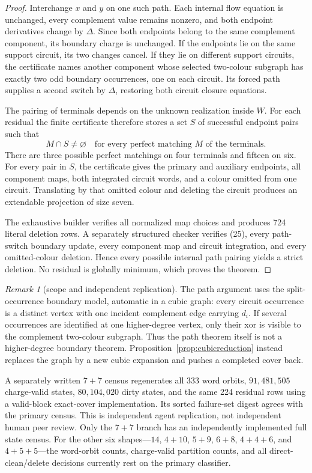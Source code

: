 \documentclass[11pt]{article}
\theoremstyle{definition}
\theoremstyle{remark}
\newtheorem{remark}[theorem]{Remark}
\begin{document}
\begin{proof}
Interchange \(x\) and \(y\) on one such path.  Each internal flow equation
is unchanged, every complement value remains nonzero, and both endpoint
derivatives change by \(\Delta\).  Since both endpoints belong to the same
complement component, its boundary charge is unchanged.
If the endpoints lie on the same support circuit, its two changes cancel.
If they lie on different support circuits, the certificate names another
component whose selected two-colour subgraph has exactly two odd boundary
occurrences, one on each circuit.  Its forced path supplies a second switch
by \(\Delta\), restoring both circuit closure equations.

The pairing of terminals depends on the unknown realization inside \(W\).
For each residual the finite certificate therefore stores a set \(S\) of
successful endpoint pairs such that
\[
                    M\cap S\ne\varnothing
       \quad\text{for every perfect matching \(M\) of the terminals}. \tag{25}
\]
There are three possible perfect matchings on four terminals and fifteen
on six.  For every pair in \(S\), the certificate gives the primary and
auxiliary endpoints, all component maps, both integrated circuit words,
and a colour omitted from one circuit.  Translating by that omitted colour
and deleting the circuit produces an extendable projection of size seven.

The exhaustive builder verifies all normalized map choices and produces
724 literal deletion rows.  A separately structured checker verifies
(25), every path-switch boundary update, every component map and circuit
integration, and every omitted-colour deletion.  Hence every possible
internal path pairing yields a strict deletion.  No residual is globally
minimum, which proves the theorem.
\end{proof}

\begin{remark}[scope and independent replication]
The path argument uses the split-occurrence boundary model, automatic in a
cubic graph: every circuit occurrence is a distinct vertex with one
incident complement edge carrying \(d_i\).  If several occurrences are
identified at one higher-degree vertex, only their xor is visible to the
complement two-colour subgraph.  Thus the path theorem itself is not a
higher-degree boundary theorem.  Proposition~\ref{prop:cubicreduction}
instead replaces the graph by a new cubic expansion and pushes a completed
cover back.

A separately written \(7+7\) census regenerates all 333 word orbits,
\(91{,}481{,}505\) charge-valid states, \(80{,}104{,}020\) dirty
states, and the same 224 residual rows using a valid-block exact-cover
implementation.  Its sorted failure-set digest agrees with the primary
census.  This is independent agent replication, not independent human
peer review.  Only the \(7+7\) branch has an independently implemented full
state census.  For the other six shapes---\(14\), \(4+10\), \(5+9\),
\(6+8\), \(4+4+6\), and \(4+5+5\)---the word-orbit counts, charge-valid
partition counts, and all direct-clean/delete decisions currently rest on
the primary classifier.
\end{remark}
\end{document}
